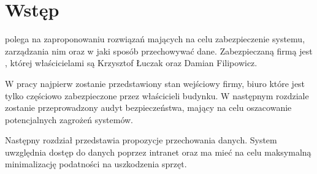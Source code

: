 \newpage\section*{Wstęp}
\TytulPolski \space polega na zaproponowaniu rozwiązań mających na celu zabezpieczenie systemu, zarządzania nim oraz w jaki sposób przechowywać dane. Zabezpieczaną firmą jest \NazwaFirmy, której właścicielami są Krzysztof Łuczak oraz Damian Filipowicz. 

W pracy najpierw zostanie przedstawiony stan wejściowy firmy, biuro które jest tylko częściowo zabezpieczone przez właścicieli budynku. \linebreak W następnym rozdziale zostanie przeprowadzony audyt bezpieczeństwa, \linebreak mający na celu oszacowanie potencjalnych zagrożeń systemów.

 Następny rozdział przedstawia propozycje przechowania danych. System uwzględnia dostęp do danych poprzez intranet oraz ma mieć na celu maksymalną minimalizację podatności na uszkodzenia sprzęt.